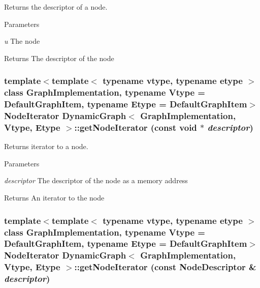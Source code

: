 Returns the descriptor of a node. 


\begin{DoxyParams}{Parameters}
\item[{\em u}]The node \end{DoxyParams}
\begin{DoxyReturn}{Returns}
The descriptor of the node 
\end{DoxyReturn}
\hypertarget{class_dynamic_graph_a4ea070c2f0f4f667dd4f6c518644c8ae}{
\subsubsection[{getNodeIterator}]{\setlength{\rightskip}{0pt plus 5cm}template$<$template$<$ typename vtype, typename etype $>$ class GraphImplementation, typename Vtype  = DefaultGraphItem, typename Etype  = DefaultGraphItem$>$ NodeIterator {\bf DynamicGraph}$<$ GraphImplementation, Vtype, Etype $>$::getNodeIterator (const void $\ast$ {\em descriptor})}}
\label{class_dynamic_graph_a4ea070c2f0f4f667dd4f6c518644c8ae}


Returns iterator to a node. 


\begin{DoxyParams}{Parameters}
\item[{\em descriptor}]The descriptor of the node as a memory address \end{DoxyParams}
\begin{DoxyReturn}{Returns}
An iterator to the node 
\end{DoxyReturn}
\hypertarget{class_dynamic_graph_aa473c6480ec8ac2fa14680c8953b10e0}{
\subsubsection[{getNodeIterator}]{\setlength{\rightskip}{0pt plus 5cm}template$<$template$<$ typename vtype, typename etype $>$ class GraphImplementation, typename Vtype  = DefaultGraphItem, typename Etype  = DefaultGraphItem$>$ NodeIterator {\bf DynamicGraph}$<$ GraphImplementation, Vtype, Etype $>$::getNodeIterator (const NodeDescriptor \& {\em descriptor})}}
\label{class_dynamic_graph_aa473c6480ec8ac2fa14680c8953b10e0}


